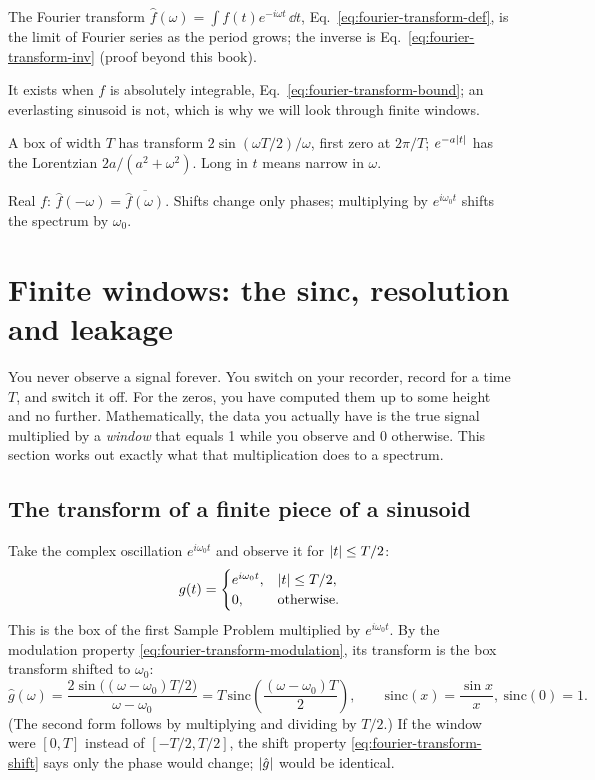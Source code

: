 \begin{keyideas}

\item The Fourier transform $\hat f(\omega)=\int f(t)e^{-i\omega t}\,\dd t$, Eq.~\eqref{eq:fourier-transform-def}, is the limit of Fourier series as the period grows; the inverse is Eq.~\eqref{eq:fourier-transform-inv} (proof beyond this book).
\item It exists when $f$ is absolutely integrable, Eq.~\eqref{eq:fourier-transform-bound}; an everlasting sinusoid is not, which is why we will look through finite windows.
\item A box of width $T$ has transform $2\sin(\omega T/2)/\omega$, first zero at $2\pi/T$; $e^{-a\left\lvert t\right\rvert}$ has the Lorentzian $2a/(a^2+\omega^2)$. Long in $t$ means narrow in $\omega$.
\item Real $f$: $\hat f(-\omega)=\overline{\hat f(\omega)}$. Shifts change only phases; multiplying by $e^{i\omega_0t}$ shifts the spectrum by $\omega_0$.

\end{keyideas}

\section{Finite windows: the sinc, resolution and leakage}\label{sec:fourier-transform-window}

You never observe a signal forever. You switch on your recorder, record for a time $T$, and switch it off. For the zeros, you have computed them up to some height and no further. Mathematically, the data you actually have is the true signal multiplied by a \emph{window} that equals 1 while you observe and 0 otherwise. This section works out exactly what that multiplication does to a spectrum.

\subsection{The transform of a finite piece of a sinusoid}

Take the complex oscillation $e^{i\omega_0t}$ and observe it for $\left\lvert t\right\rvert\le T/2$:
\[g(t)=\begin{cases}e^{i\omega_0 t},&\left\lvert t\right\rvert\le T/2,\\0,&\text{otherwise.}\end{cases}\]
This is the box of the first Sample Problem multiplied by $e^{i\omega_0t}$. By the modulation property \eqref{eq:fourier-transform-modulation}, its transform is the box transform shifted to $\omega_0$:
\begin{equation}
\hat g(\omega)=\frac{2\sin\bigl((\omega-\omega_0)T/2\bigr)}{\omega-\omega_0}=T\,\mathrm{sinc}\!\left(\frac{(\omega-\omega_0)T}{2}\right),
\qquad \mathrm{sinc}(x)=\frac{\sin x}{x},\ \mathrm{sinc}(0)=1.
\label{eq:fourier-transform-sinc}
\end{equation}
(The second form follows by multiplying and dividing by $T/2$.) If the window were $[0,T]$ instead of $[-T/2,T/2]$, the shift property \eqref{eq:fourier-transform-shift} says only the phase would change; $\left\lvert \hat g\right\rvert$ would be identical.

